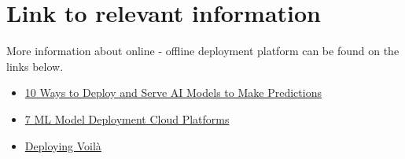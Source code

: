 \section{Link to relevant information}

More information about online - offline deployment platform can be found on the links below.\newline

\begin{itemize}
	\item \href{https://towardsdatascience.com/10-ways-to-deploy-and-serve-ai-models-to-make-predictions-336527ef00b2}{10 Ways to Deploy and Serve AI Models to Make Predictions}
	\item \href{https://www.freecodecamp.org/news/deploy-your-machine-learning-models-for-free/}{7 ML Model Deployment Cloud Platforms}
	\item \href{https://voila.readthedocs.io/en/stable/deploy.html}{Deploying Voilà}
	

\end{itemize}

\newpage